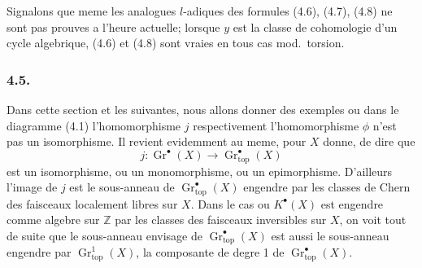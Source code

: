 Signalons que meme les analogues $l$-adiques des formules (4.6), (4.7), (4.8) ne sont pas prouves a l'heure actuelle; lorsque $y$ est la classe de cohomologie d'un cycle algebrique, (4.6) et (4.8) sont vraies en tous cas mod.\ torsion.


\subsubsection*{4.5.}
Dans cette section et les suivantes, nous allons donner des exemples ou dans le diagramme (4.1) l'homomorphisme $j$ respectivement l'homomorphisme $\phi$ n'est pas un isomorphisme. Il revient evidemment au meme, pour $X$ donne, de dire que
\[
j : \operatorname{Gr}^{\bullet}(X) \longrightarrow \operatorname{Gr}_{\mathrm{top}}^{\bullet}(X)
\]
est un isomorphisme, ou un monomorphisme, ou un epimorphisme. D'ailleurs l'image de $j$ est le sous-anneau de $\operatorname{Gr}_{\mathrm{top}}^{\bullet}(X)$ engendre par les classes de Chern des faisceaux localement libres sur $X$. Dans le cas ou $K^{\bullet}(X)$ est engendre comme algebre sur $\mathbb{Z}$ par les classes des faisceaux inversibles sur $X$, on voit tout de suite que le sous-anneau envisage de $\operatorname{Gr}_{\mathrm{top}}^{\bullet}(X)$ est aussi le sous-anneau engendre par $\operatorname{Gr}_{\mathrm{top}}^{1}(X)$, la composante de degre 1 de $\operatorname{Gr}_{\mathrm{top}}^{\bullet}(X)$.

